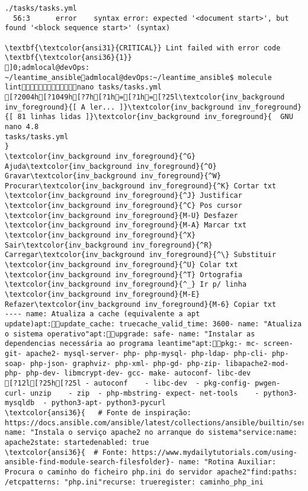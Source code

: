 \documentclass{scrartcl}
\begin{document}
\begin{Verbatim}
./tasks/tasks.yml
  56:3      error    syntax error: expected '<document start>', but found '<block sequence start>' (syntax)

\textbf{\textcolor{ansi31}{CRITICAL}} Lint failed with error code \textbf{\textcolor{ansi36}{1}}
]0;admlocal@devOps: ~/leantime_ansibleadmlocal@devOps:~/leantime_ansible$ molecule lintnano tasks/tasks.yml 
[?2004h[?1049h[?7h[?1h=[?1h=[?25l\textcolor{inv_background inv_foreground}{[ A ler... ]}\textcolor{inv_background inv_foreground}{[ 81 linhas lidas ]}\textcolor{inv_background inv_foreground}{  GNU nano 4.8                                                tasks/tasks.yml                                                             }
\textcolor{inv_background inv_foreground}{^G} Ajuda\textcolor{inv_background inv_foreground}{^O} Gravar\textcolor{inv_background inv_foreground}{^W} Procurar\textcolor{inv_background inv_foreground}{^K} Cortar txt    \textcolor{inv_background inv_foreground}{^J} Justificar    \textcolor{inv_background inv_foreground}{^C} Pos cursor    \textcolor{inv_background inv_foreground}{M-U} Desfazer     \textcolor{inv_background inv_foreground}{M-A} Marcar txt
\textcolor{inv_background inv_foreground}{^X} Sair\textcolor{inv_background inv_foreground}{^R} Carregar\textcolor{inv_background inv_foreground}{^\} Substituir    \textcolor{inv_background inv_foreground}{^U} Colar txt     \textcolor{inv_background inv_foreground}{^T} Ortografia    \textcolor{inv_background inv_foreground}{^_} Ir p/ linha   \textcolor{inv_background inv_foreground}{M-E} Refazer\textcolor{inv_background inv_foreground}{M-6} Copiar txt
---- name: Atualiza a cache (equivalente a apt update)apt:update_cache: truecache_valid_time: 3600- name: "Atualiza o sistema operativo"apt:upgrade: safe- name: "Instalar as dependencias necessária ao programa leantime"apt:pkg:- mc- screen- git- apache2- mysql-server- php- php-mysql- php-ldap- php-cli- php-soap- php-json- graphviz- php-xml- php-gd- php-zip- libapache2-mod-php- php-dev- libmcrypt-dev- gcc- make- autoconf- libc-dev
[?12l[?25h[?25l - autoconf    - libc-dev  - pkg-config- pwgen- curl- unzip    - zip  - php-mbstring- expect- net-tools    - python3-mysqldb  - python3-apt- python3-pycurl
\textcolor{ansi36}{   # Fonte de inspiração: https://docs.ansible.com/ansible/latest/collections/ansible/builtin/service_module.html}- name: "Instala o serviço apache2 no arranque do sistema"service:name: apache2state: startedenabled: true
\textcolor{ansi36}{  # Fonte: https://www.mydailytutorials.com/using-ansible-find-module-search-filesfolder}- name: "Rotina Auxiliar: Procura o caminho do ficheiro php.ini do servidor apache2"find:paths: /etcpatterns: "php.ini"recurse: trueregister: caminho_php_ini

\end{Verbatim}
\end{document}
